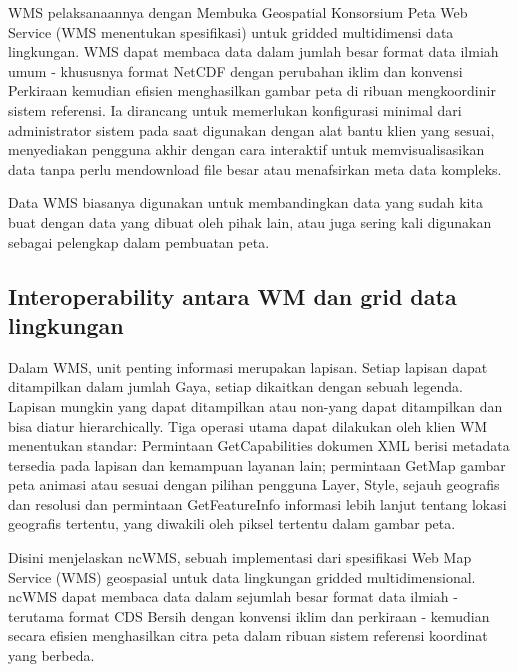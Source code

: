    WMS pelaksanaannya dengan Membuka Geospatial Konsorsium Peta Web Service (WMS menentukan spesifikasi) untuk gridded multidimensi data lingkungan. WMS dapat membaca data dalam jumlah besar format data ilmiah umum - khususnya format NetCDF dengan perubahan iklim dan konvensi Perkiraan kemudian efisien menghasilkan gambar peta di ribuan mengkoordinir sistem referensi. Ia dirancang untuk memerlukan konfigurasi minimal dari administrator sistem pada saat digunakan dengan alat bantu klien yang sesuai, menyediakan pengguna akhir dengan cara interaktif untuk memvisualisasikan data tanpa perlu mendownload file besar atau menafsirkan meta data kompleks. 

Data WMS biasanya digunakan untuk membandingkan data yang sudah kita buat dengan data yang dibuat oleh pihak lain, atau juga sering kali
digunakan sebagai pelengkap dalam pembuatan peta.

\subsection{Interoperability antara WM dan grid data lingkungan}

Dalam WMS, unit penting informasi merupakan lapisan. Setiap lapisan dapat ditampilkan dalam jumlah Gaya, setiap dikaitkan dengan sebuah
legenda. Lapisan mungkin yang dapat ditampilkan atau non-yang dapat ditampilkan dan bisa diatur hierarchically. Tiga operasi utama dapat
dilakukan oleh klien WM menentukan standar: Permintaan GetCapabilities dokumen XML berisi metadata tersedia pada lapisan dan kemampuan
layanan lain; permintaan GetMap gambar peta animasi atau sesuai dengan pilihan pengguna Layer, Style, sejauh geografis dan resolusi dan
permintaan GetFeatureInfo informasi lebih lanjut tentang lokasi geografis tertentu, yang diwakili oleh piksel tertentu dalam gambar
peta.

Disini menjelaskan ncWMS, sebuah implementasi dari spesifikasi Web Map Service (WMS) geospasial untuk data lingkungan gridded
multidimensional. ncWMS dapat membaca data dalam sejumlah besar format data ilmiah - terutama format CDS Bersih dengan konvensi iklim 
dan perkiraan - kemudian secara efisien menghasilkan citra peta dalam ribuan sistem referensi koordinat yang berbeda.

